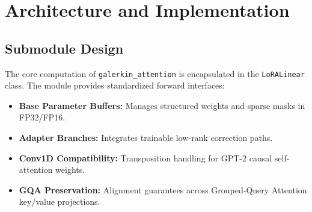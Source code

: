\section{Architecture and Implementation}

\subsection{Submodule Design}
The core computation of \texttt{galerkin_attention} is encapsulated in the \texttt{LoRALinear} class. The module provides standardized forward interfaces:
\begin{itemize}
\item \textbf{Base Parameter Buffers:} Manages structured weights and sparse masks in FP32/FP16.
\item \textbf{Adapter Branches:} Integrates trainable low-rank correction paths.
\item \textbf{Conv1D Compatibility:} Transposition handling for GPT-2 causal self-attention weights.
\item \textbf{GQA Preservation:} Alignment guarantees across Grouped-Query Attention key/value projections.
\end{itemize}
